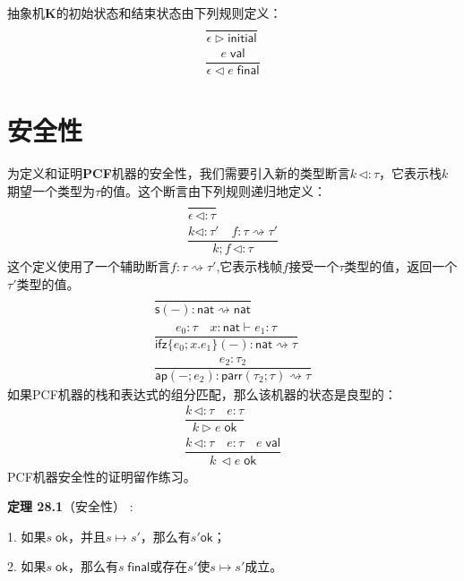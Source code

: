 抽象机\textbf{K}的初始状态和结束状态由下列规则定义：
\begin{subequations}
    \begin{gather}
       \dfrac{}{\epsilon \triangleright \mathsf{initial}}\\
       \dfrac{e \; \mathsf{val}}{\epsilon \triangleleft e \; \mathsf{final}}
    \end{gather}
\end{subequations}

\section{安全性}
为定义和证明\textbf{PCF}机器的安全性，我们需要引入新的类型断言$k \, \triangleleft : \tau $，它表示栈$k$期望一个类型为$\tau$的值。这个断言由下列规则递归地定义：
\begin{subequations}
    \begin{gather}
       \dfrac{}{\epsilon \, \triangleleft : \tau}\\
       \dfrac{k \triangleleft : \tau ' \quad f: \tau \rightsquigarrow \tau '}{k;f \, \triangleleft : \tau}
    \end{gather}
\end{subequations}
这个定义使用了一个辅助断言$f: \tau \rightsquigarrow \tau '$,它表示栈帧$f$接受一个$\tau$类型的值，返回一个$\tau '$类型的值。
\begin{subequations}
    \begin{gather}
       \dfrac{}{\mathsf{s} (-): \mathsf{nat} \rightsquigarrow \mathsf{nat}}\\
       \dfrac{e_0: \tau \quad x: \mathsf{nat} \vdash e_1: \tau}{\mathsf{ifz} \{ e_0;x.e_1 \} (-): \mathsf{nat} \rightsquigarrow \tau}\\
       \dfrac{e_2: \tau_2}{\mathsf{ap} (-;e_2): \mathsf{parr} ( \tau_2 ; \tau ) \rightsquigarrow \tau}
    \end{gather}
\end{subequations}
如果PCF机器的栈和表达式的组分匹配，那么该机器的状态是良型的：
\begin{subequations}
    \begin{gather}
       \dfrac{k \, \triangleleft : \tau \quad e: \tau}{k \triangleright e \; \mathsf{ok}}\\
       \dfrac{k \, \triangleleft : \tau \quad e: \tau \quad e \; \mathsf{val}}{k \, \triangleleft e \; \mathsf{ok}}
    \end{gather}
\end{subequations}
PCF机器安全性的证明留作练习。

\textbf{定理 28.1}（安全性） :

1. 如果$s \; \mathsf{ok}$，并且$s \longmapsto s'$，那么有$s' \mathsf{ok}$；

2. 如果$s \; \mathsf{ok}$，那么有$s \; \mathsf{final}$或存在$s'$使$s \longmapsto s'$成立。
